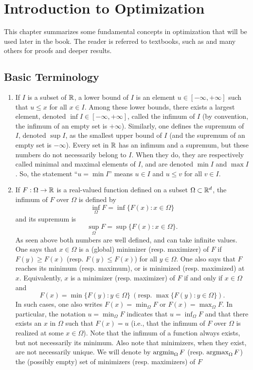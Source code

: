 \chapter{Introduction to Optimization}
\label{sec:optim}
\label{chap:optim}

This chapter summarizes some fundamental concepts in optimization that will be used later in the book. The reader is referred to textbooks, such as \citet{beck2014introduction,eiselt2019nonlinear,nocedal2006nonlinear,boyd2011distributed}  and many others for proofs and deeper results.

\section{Basic Terminology}
\begin{enumerate}[label={\bf \arabic*.}]
\item If $I$ is a subset of ${\mathbb{R}}$, a lower bound of $I$ is an element $u\in [-\infty, +\infty]$ such that $u\leq x$ for all $x\in I$. Among these lower bounds, there exists a largest element, denoted $\inf I \in [-\infty, +\infty]$, called the infimum of $I$ (by convention,  the infimum of an empty set is $+\infty$). Similarly, one defines the supremum of $I$, denoted $\sup I$, as the smallest upper bound of $I$ (and the supremum of an empty set is $-\infty$). Every set in ${\mathbb{R}}$ has an infimum and a supremum, but these numbers do not necessarily belong to $I$. When they do, they are respectively called minimal and maximal elements of $I$, and are denoted $\min I$ and $\max I$. So, the statement ``$u= \min I$'' means $u\in I$ and $u\leq v$ for all $v\in I$.

\item If $F:\Omega \to {\mathbb{R}}$ is a real-valued function defined on a subset $\Omega \subset {\mathbb{R}}^d$, the infimum of $F$ over $\Omega$ is defined by
\[
\inf_{\Omega} F = \inf\{F(x): x\in \Omega\} %
\]
and its supremum is
\[
\sup_{\Omega} F = \sup\{F(x): x\in \Omega\}.
\]
As seen above both numbers are well defined, and can take infinite values. One says that $x\in \Omega$ is a (global) minimizer (resp. maximizer) of $F$ if $F(y) \geq F(x)$ (resp. $F(y)\leq F(x)$) for all $y\in \Omega$.  One also says that $F$ reaches its minimum (resp. maximum), or is minimized (resp. maximized) at $x$. Equivalently, $x$ is a minimizer (resp. maximizer) of $F$ if and only if $x\in \Omega$ and
\[
F(x) = \min \{F(y): y\in \Omega\} \ (\text{resp. } \max\{F(y): y\in \Omega\}).
\]
In such cases, one also writes $F(x) = \min_\Omega F$ or $F(x) = \max_\Omega F$. In particular, the
notation $u = \min_\Omega F$ indicates that $u = \inf_\Omega F$ and that there exists an $x$ in $\Omega$ such that $F(x) = u$ (i.e., that the infimum of $F$ over $\Omega$ is realized at some $x\in \Omega$).  Note that the infimum of a function always exists, but not necessarily its minimum. Also note that minimizers, when they exist, are not necessarily unique. We will denote by $\operatorname*{argmin}_{\Omega} F$ (resp. $\operatorname*{argmax}_\Omega F$) the (possibly empty) set of minimizers (resp. maximizers) of $F$


\end{enumerate}
